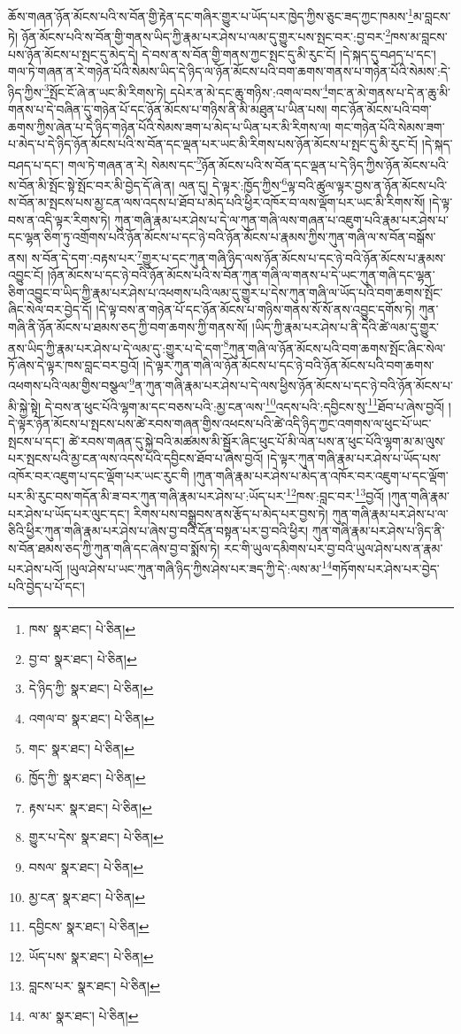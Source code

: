 ཆོས་གཞན་ཉོན་མོངས་པའི་ས་བོན་གྱི་རྟེན་དང་གཞིར་གྱུར་པ་ཡོད་པར་ཁྱེད་ཀྱིས་ཅུང་ཟད་ཀྱང་ཁམས་\footnote{ཁས་  སྣར་ཐང་།  པེ་ཅིན། }མ་བླངས་ཏེ། ཉོན་མོངས་པའི་ས་བོན་གྱི་གནས་ཡིད་ཀྱི་རྣམ་པར་ཤེས་པ་ལམ་དུ་གྱུར་པས་སྤང་བར་:བྱ་བར་\footnote{བྱ་བ་  སྣར་ཐང་།  པེ་ཅིན། }ཁས་མ་བླངས་པས་ཉོན་མོངས་པ་སྤང་དུ་མེད་དེ། དེ་བས་ན་ས་བོན་གྱི་གནས་ཀྱང་སྤང་དུ་མི་རུང་ངོ། །དེ་སྐད་དུ་བཤད་པ་དང་། གལ་ཏེ་གཞན་ན་རེ་གཉེན་པོའི་སེམས་ཡིད་དེ་ཉིད་ལ་ཉོན་མོངས་པའི་བག་ཆགས་གནས་པ་གཉེན་པོའི་སེམས་:དེ་ཉིད་ཀྱིས་\footnote{དེ་ཉིད་ཀྱི་  སྣར་ཐང་།  པེ་ཅིན། }སྤོང་ངོ་ཞེ་ན་ཡང་མི་རིགས་ཏེ། དཔེར་ན་མེ་དང་ཆུ་གཉིས་:འགལ་བས་\footnote{འགལ་བ་  སྣར་ཐང་།  པེ་ཅིན། }གང་ན་མེ་གནས་པ་དེ་ན་ཆུ་མི་གནས་པ་དེ་བཞིན་དུ་གཉེན་པོ་དང་ཉོན་མོངས་པ་གཉིས་ནི་མི་མཐུན་པ་ཡིན་པས། གང་ཉོན་མོངས་པའི་བག་ཆགས་ཀྱིས་ཞེན་པ་དེ་ཉིད་གཉེན་པོའི་སེམས་ཟག་པ་མེད་པ་ཡིན་པར་མི་རིགས་ལ། གང་གཉེན་པོའི་སེམས་ཟག་པ་མེད་པ་དེ་ཉིད་ཉོན་མོངས་པའི་ས་བོན་དང་ལྡན་པར་ཡང་མི་རིགས་པས་ཉོན་མོངས་པ་སྤང་དུ་མི་རུང་ངོ། །དེ་སྐད་བཤད་པ་དང་། གལ་ཏེ་གཞན་ན་རེ། སེམས་དང་\footnote{གང་  སྣར་ཐང་།  པེ་ཅིན། }ཉོན་མོངས་པའི་ས་བོན་དང་ལྡན་པ་དེ་ཉིད་ཀྱིས་ཉོན་མོངས་པའི་ས་བོན་མི་སྤོང་སྟེ་སྤོང་བར་མི་བྱེད་དོ་ཞེ་ན། ལན་དུ། དེ་ལྟར་:ཁྱོད་ཀྱིས་\footnote{ཁྱོད་ཀྱི་  སྣར་ཐང་།  པེ་ཅིན། }ལྟ་བའི་ཚུལ་ལྟར་བྱས་ན་ཉོན་མོངས་པའི་ས་བོན་མ་སྤངས་པས་མྱ་ངན་ལས་འདས་པ་ཐོབ་པ་མེད་པའི་ཕྱིར་འཁོར་བ་ལས་ལྡོག་པར་ཡང་མི་རིགས་སོ། །དེ་ལྟ་བས་ན་འདི་ལྟར་རིགས་ཏེ། ཀུན་གཞི་རྣམ་པར་ཤེས་པ་དེ་ལ་ཀུན་གཞི་ལས་གཞན་པ་འཇུག་པའི་རྣམ་པར་ཤེས་པ་དང་ལྷན་ཅིག་ཏུ་འགྲོགས་པའི་ཉོན་མོངས་པ་དང་ཉེ་བའི་ཉོན་མོངས་པ་རྣམས་ཀྱིས་ཀུན་གཞི་ལ་ས་བོན་བསྒོས་ནས། ས་བོན་དེ་དག་:བརྟས་པར་\footnote{རྟས་པར་  སྣར་ཐང་།  པེ་ཅིན། }གྱུར་པ་དང་ཀུན་གཞི་ཉིད་ལས་ཉོན་མོངས་པ་དང་ཉེ་བའི་ཉོན་མོངས་པ་རྣམས་འབྱུང་ངོ། །ཉོན་མོངས་པ་དང་ཉེ་བའི་ཉོན་མོངས་པའི་ས་བོན་ཀུན་གཞི་ལ་གནས་པ་དེ་ཡང་ཀུན་གཞི་དང་ལྷན་ཅིག་འབྱུང་བ་ཡིད་ཀྱི་རྣམ་པར་ཤེས་པ་འཕགས་པའི་ལམ་དུ་གྱུར་པ་དེས་ཀུན་གཞི་ལ་ཡོད་པའི་བག་ཆགས་སྤོང་ཞིང་སེལ་བར་བྱེད་དོ། །དེ་ལྟ་བས་ན་གཉེན་པོ་དང་ཉོན་མོངས་པ་གཉིས་གནས་སོ་སོ་ནས་འབྱུང་དགོས་ཏེ། ཀུན་གཞི་ནི་ཉོན་མོངས་པ་ཐམས་ཅད་ཀྱི་བག་ཆགས་ཀྱི་གནས་སོ། །ཡིད་ཀྱི་རྣམ་པར་ཤེས་པ་ནི་དེའི་ཚེ་ལམ་དུ་གྱུར་ནས་ཡིད་ཀྱི་རྣམ་པར་ཤེས་པ་དེ་ལམ་དུ་:གྱུར་པ་དེ་དག་\footnote{གྱུར་པ་དེས་  སྣར་ཐང་།  པེ་ཅིན། }ཀུན་གཞི་ལ་ཉོན་མོངས་པའི་བག་ཆགས་སྤོང་ཞིང་སེལ་ཏོ་ཞེས་དེ་ལྟར་ཁས་བླང་བར་བྱའོ། །དེ་ལྟར་ཀུན་གཞི་ལ་ཉོན་མོངས་པ་དང་ཉེ་བའི་ཉོན་མོངས་པའི་བག་ཆགས་འཕགས་པའི་ལམ་གྱིས་བསྩལ་\footnote{བསལ་  སྣར་ཐང་།  པེ་ཅིན། }ན་ཀུན་གཞི་རྣམ་པར་ཤེས་པ་དེ་ལས་ཕྱིས་ཉོན་མོངས་པ་དང་ཉེ་བའི་ཉོན་མོངས་པ་མི་སྐྱེ་སྟེ། དེ་བས་ན་ཕུང་པོའི་ལྷག་མ་དང་བཅས་པའི་:མྱ་ངན་ལས་\footnote{མྱ་ངན་  སྣར་ཐང་།  པེ་ཅིན། }འདས་པའི་:དབྱིངས་སུ་\footnote{དབྱིངས་  སྣར་ཐང་།  པེ་ཅིན། }ཐོབ་པ་ཞེས་བྱའོ། །དེ་ལྟར་ཉོན་མོངས་པ་སྤངས་པས་ཚེ་རབས་གཞན་གྱིས་འཕངས་པའི་ཚེ་འདི་ཉིད་ཀྱང་འགགས་ལ་ཕུང་པོ་ཡང་སྤངས་པ་དང་། ཚེ་རབས་གཞན་དུ་སྐྱེ་བའི་མཚམས་མི་སྦྱོར་ཞིང་ཕུང་པོ་མི་ལེན་པས་ན་ཕུང་པོའི་ལྷག་མ་མ་ལུས་པར་སྤངས་པའི་མྱ་ངན་ལས་འདས་པའི་དབྱིངས་ཐོབ་པ་ཞེས་བྱའོ། །དེ་ལྟར་ཀུན་གཞི་རྣམ་པར་ཤེས་པ་ཡོད་པས་འཁོར་བར་འཇུག་པ་དང་ལྡོག་པར་ཡང་རུང་གི །ཀུན་གཞི་རྣམ་པར་ཤེས་པ་མེད་ན་འཁོར་བར་འཇུག་པ་དང་ལྡོག་པར་མི་རུང་བས་གདོན་མི་ཟ་བར་ཀུན་གཞི་རྣམ་པར་ཤེས་པ་:ཡོད་པར་\footnote{ཡོད་པས་  སྣར་ཐང་།  པེ་ཅིན། }ཁས་:བླང་བར་\footnote{བླངས་པར་  སྣར་ཐང་།  པེ་ཅིན། }བྱའོ། །ཀུན་གཞི་རྣམ་པར་ཤེས་པ་ཡོད་པར་ལུང་དང་། རིགས་པས་བསྒྲུབས་ནས་རྩོད་པ་མེད་པར་བྱས་ཏེ། ཀུན་གཞི་རྣམ་པར་ཤེས་པ་ལ་ཅིའི་ཕྱིར་ཀུན་གཞི་རྣམ་པར་ཤེས་པ་ཞེས་བྱ་བའི་དོན་བསྟན་པར་བྱ་བའི་ཕྱིར། ཀུན་གཞི་རྣམ་པར་ཤེས་པ་ཉིད་ནི་ས་བོན་ཐམས་ཅད་ཀྱི་ཀུན་གཞི་དང་ཞེས་བྱ་བ་སྨོས་ཏེ། རང་གི་ཡུལ་དམིགས་པར་བྱ་བའི་ཡུལ་ཤེས་པས་ན་རྣམ་པར་ཤེས་པའོ། །ཡུལ་ཤེས་པ་ཡང་ཀུན་གཞི་ཉིད་ཀྱིས་ཤེས་པར་ཟད་ཀྱི་དེ་:ལས་མ་\footnote{ལ་མ་  སྣར་ཐང་།  པེ་ཅིན། }གཏོགས་པར་ཤེས་པར་བྱེད་པའི་བྱེད་པ་པོ་དང་། 